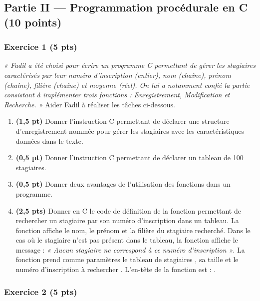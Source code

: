 \subsection*{Partie II — Programmation procédurale en C \hfill (10 points)}

\subsubsection*{Exercice 1 \hfill (5 pts)}

\noindent\emph{« Fadil a été choisi pour écrire un programme C permettant de gérer les
stagiaires caractérisés par leur numéro d'inscription (entier), nom (chaîne), prénom
(chaîne), filière (chaîne) et moyenne (réel). On lui a notamment confié la partie consistant
à implémenter trois fonctions : Enregistrement, Modification et Recherche. »} Aider Fadil à
réaliser les tâches ci-dessous.

\begin{enumerate}[label=\textbf{\arabic*.}]
\item \textbf{(1,5 pt)} Donner l'instruction C permettant de déclarer une structure
d'enregistrement nommée  pour gérer les stagiaires avec les caractéristiques
données dans le texte.
\item \textbf{(0,5 pt)} Donner l'instruction C permettant de déclarer un tableau  de
100 stagiaires.
\item \textbf{(0,5 pt)} Donner deux avantages de l'utilisation des fonctions dans un programme.
\item \textbf{(2,5 pts)} Donner en C le code de définition de la fonction 
permettant de rechercher un stagiaire par son numéro d'inscription dans un tableau. La
fonction affiche le nom, le prénom et la filière du stagiaire recherché. Dans le cas où le
stagiaire n'est pas présent dans le tableau, la fonction affiche le message :
\emph{« Aucun stagiaire ne correspond à ce numéro d'inscription »}. La fonction prend comme
paramètres le tableau de stagiaires , sa taille  et le numéro d'inscription à
rechercher . L'en-tête de la fonction est :
.
\end{enumerate}

\subsubsection*{Exercice 2 \hfill (5 pts)}

